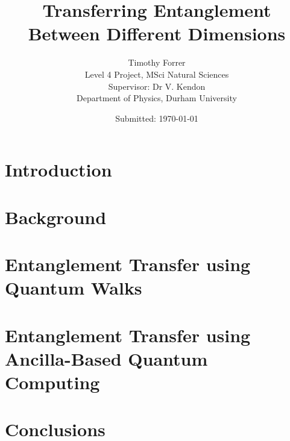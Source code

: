 \documentclass[12pt, onecolumn]{article}
\begin{document}
\title{\bf{Transferring Entanglement Between Different Dimensions}} 
\date{Submitted: \today{}}
\author{
    Timothy Forrer\\
    Level 4 Project, MSci Natural Sciences\\
    Supervisor: Dr V. Kendon\\
    Department of Physics, Durham University}

\maketitle



\newpage

\tableofcontents

\newpage

\section{Introduction}
\label{section:intro}


\section{Background}
\label{section:background}

\label{subsection:qc_primer}

\label{subsection:entangle}

\label{subsection:qw}

\label{subsection:aqc}

\section{Entanglement Transfer using Quantum Walks}
\label{section:qw_transfer}


\section{Entanglement Transfer using Ancilla-Based Quantum Computing}
\label{section:aqc_transfer}


\section{Conclusions}
\label{section:conclusion}




\printbibliography[heading=bibintoc]

\newpage


\end{document}
